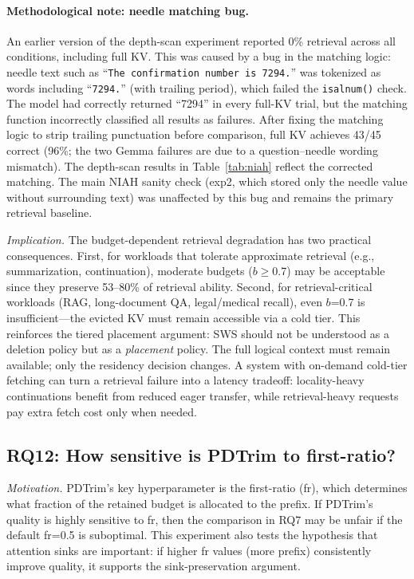 \documentclass[11pt]{article}
\newcommand{\sws}{SWS}
\newcommand{\pct}{\%}
\theoremstyle{definition}
\theoremstyle{plain}
\begin{document}
\paragraph{Methodological note: needle matching bug.}  An earlier version of the depth-scan experiment reported 0\pct{} retrieval across all conditions, including full KV.  This was caused by a bug in the matching logic: needle text such as ``\texttt{The confirmation number is 7294.}'' was tokenized as words including ``\texttt{7294.}'' (with trailing period), which failed the \texttt{isalnum()} check.  The model had correctly returned ``7294'' in every full-KV trial, but the matching function incorrectly classified all results as failures.  After fixing the matching logic to strip trailing punctuation before comparison, full KV achieves 43/45 correct (96\pct{}; the two Gemma failures are due to a question--needle wording mismatch).  The depth-scan results in Table~\ref{tab:niah} reflect the corrected matching.  The main NIAH sanity check (exp2, which stored only the needle value without surrounding text) was unaffected by this bug and remains the primary retrieval baseline.

\emph{Implication.}  The budget-dependent retrieval degradation has two practical consequences.  First, for workloads that tolerate approximate retrieval (e.g., summarization, continuation), moderate budgets ($b$$\geq$0.7) may be acceptable since they preserve 53--80\pct{} of retrieval ability.  Second, for retrieval-critical workloads (RAG, long-document QA, legal/medical recall), even $b$=0.7 is insufficient---the evicted KV must remain accessible via a cold tier.  This reinforces the tiered placement argument: \sws{} should not be understood as a deletion policy but as a \emph{placement} policy.  The full logical context must remain available; only the residency decision changes.  A system with on-demand cold-tier fetching can turn a retrieval failure into a latency tradeoff: locality-heavy continuations benefit from reduced eager transfer, while retrieval-heavy requests pay extra fetch cost only when needed.

\subsection{RQ12: How sensitive is PDTrim to first-ratio?}
\label{sec:rq12}

\emph{Motivation.}  PDTrim's key hyperparameter is the first-ratio (fr), which determines what fraction of the retained budget is allocated to the prefix.  If PDTrim's quality is highly sensitive to fr, then the comparison in RQ7 may be unfair if the default fr=0.5 is suboptimal.  This experiment also tests the hypothesis that attention sinks are important: if higher fr values (more prefix) consistently improve quality, it supports the sink-preservation argument.
\end{document}
